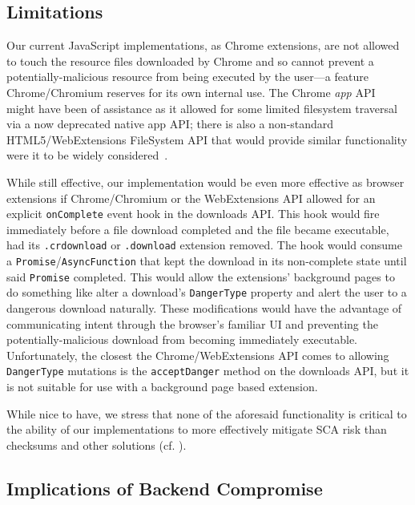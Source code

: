\subsection{Limitations}


Our current JavaScript implementations, as Chrome extensions, are not allowed to
touch the resource files downloaded by Chrome and so cannot prevent a
potentially-malicious resource from being executed by the user---a feature
Chrome/Chromium reserves for its own internal use. The Chrome \textit{app}
API~\cite{AppAPI} might have been of assistance as it allowed for some limited
filesystem traversal via a now deprecated native app API; there is also a
non-standard HTML5/WebExtensions FileSystem API that would provide similar
functionality were it to be widely considered~\cite{deadSpec}.

While still effective, our implementation would be even more effective as
browser extensions if Chrome/Chromium or the WebExtensions API allowed for an
explicit \texttt{onComplete} event hook in the downloads API. This hook would
fire immediately before a file download completed and the file became
executable, \ie had its \texttt{.crdownload} or \texttt{.download} extension
removed. The hook would consume a \texttt{Promise}/\texttt{AsyncFunction} that
kept the download in its non-complete state until said \texttt{Promise}
completed. This would allow the extensions' background pages to do something
like alter a download's \texttt{DangerType} property and alert the user to a
dangerous download naturally. These modifications would have the advantage of
communicating intent through the browser's familiar UI and preventing the
potentially-malicious download from becoming immediately executable.
Unfortunately, the closest the Chrome/WebExtensions API comes to allowing
\texttt{DangerType} mutations is the \texttt{acceptDanger} method on the
downloads API, but it is not suitable for use with a background page based
extension.

While nice to have, we stress that none of the aforesaid functionality is
critical to the ability of our implementations to more effectively mitigate SCA
risk than checksums and other solutions (cf. ).




\subsection{Implications of Backend Compromise}

